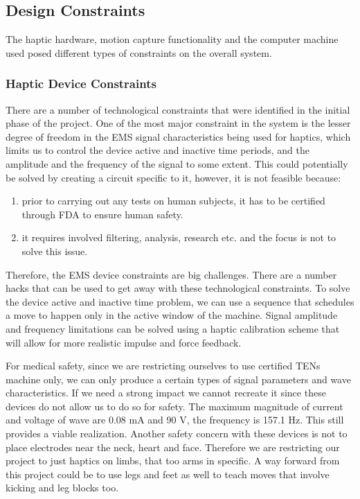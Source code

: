 \subsection{Design Constraints}
\label{sub:designConstraints}
The haptic hardware, motion capture functionality and the computer machine used posed different types of constraints on the overall system. 

\subsubsection{Haptic Device Constraints}

There are a number of technological constraints that were identified in the initial phase of the project. One of the most major constraint in the system is the lesser degree of freedom in the EMS signal characteristics being used for haptics, which limits us to control the device active and inactive time periods, and the amplitude and the frequency of the signal to some extent. This could potentially be solved by creating a circuit specific to it, however, it is not feasible because:

\begin{enumerate}
  \item prior to carrying out any tests on human subjects, it has to be certified through FDA to ensure human safety. 
  \item it requires involved filtering, analysis, research etc. and the focus is not to solve this issue.
\end{enumerate}

Therefore, the EMS device constraints are big challenges. There are a number hacks that can be used to get away with these technological constraints. To solve the device active and inactive time problem, we can use a sequence that schedules a move to happen only in the active window of the machine. Signal amplitude and frequency limitations can be solved using a haptic calibration scheme that will allow for more realistic impulse and force feedback. 


For medical safety, since we are restricting ourselves to use certified TENs machine only, we can only produce a certain types of signal parameters and wave characteristics. If we need a strong impact we cannot recreate it since these devices do not allow us to do so for safety. The maximum magnitude of current and voltage of wave are 0.08 mA and 90 V, the frequency is 157.1 Hz. This still provides a viable realization. Another safety concern with these devices is not to place electrodes near the neck, heart and face. Therefore we are restricting our project to just haptics on limbs, that too arms in specific. A way forward from this project could be to use legs and feet as well to teach moves that involve kicking and leg blocks too.


